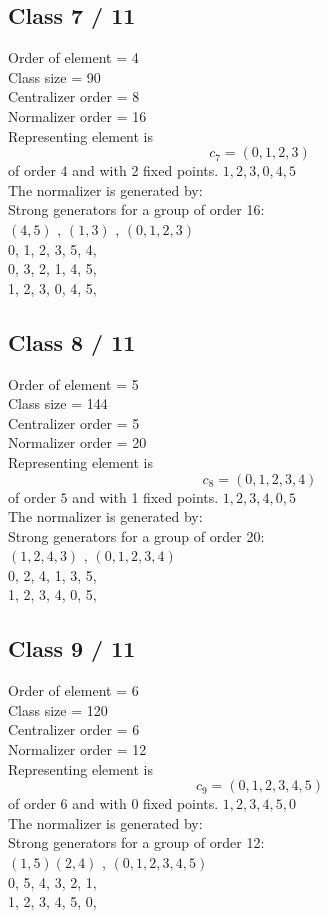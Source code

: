 \subsection*{Class 7 / 11}
Order of element = 4\\
Class size = 90\\
Centralizer order = 8\\
Normalizer order = 16\\
Representing element is
$$c_{7} = 
(0, 1, 2, 3)$$
of order $4$ and with 2 fixed points.
$1,2,3,0,4,5$\\
The normalizer is generated by:\\
Strong generators for a group of order 16:\\
$
(4, 5)$
, 
$
(1, 3)$
, 
$
(0, 1, 2, 3)$
\\
0, 1, 2, 3, 5, 4, \\
0, 3, 2, 1, 4, 5, \\
1, 2, 3, 0, 4, 5, \\
\bigskip
\subsection*{Class 8 / 11}
Order of element = 5\\
Class size = 144\\
Centralizer order = 5\\
Normalizer order = 20\\
Representing element is
$$c_{8} = 
(0, 1, 2, 3, 4)$$
of order $5$ and with 1 fixed points.
$1,2,3,4,0,5$\\
The normalizer is generated by:\\
Strong generators for a group of order 20:\\
$
(1, 2, 4, 3)$
, 
$
(0, 1, 2, 3, 4)$
\\
0, 2, 4, 1, 3, 5, \\
1, 2, 3, 4, 0, 5, \\
\bigskip
\subsection*{Class 9 / 11}
Order of element = 6\\
Class size = 120\\
Centralizer order = 6\\
Normalizer order = 12\\
Representing element is
$$c_{9} = 
(0, 1, 2, 3, 4, 5)$$
of order $6$ and with 0 fixed points.
$1,2,3,4,5,0$\\
The normalizer is generated by:\\
Strong generators for a group of order 12:\\
$
(1, 5)(2, 4)$
, 
$
(0, 1, 2, 3, 4, 5)$
\\
0, 5, 4, 3, 2, 1, \\
1, 2, 3, 4, 5, 0, \\
\bigskip
